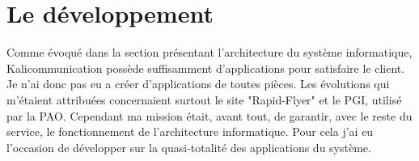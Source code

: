 \section{Le développement}
Comme évoqué dans la section présentant l'architecture du système informatique, Kalicommunication possède suffisamment d'applications pour satisfaire le client. Je n'ai donc pas eu a créer d'applications de toutes pièces. Les évolutions qui m'étaient attribuées concernaient surtout le site "Rapid-Flyer" et le PGI, utilisé par la PAO. Cependant ma mission était, avant tout, de garantir, avec le reste du service, le fonctionnement de l'architecture informatique. Pour cela j'ai eu l'occasion de développer sur la quasi-totalité des applications du système.

